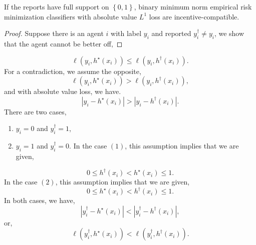 \documentclass{article}
\begin{document}
\begin{lem} \label{lem:dfpd} 
If the reports have full support on $\left\{0, 1\right\}$, binary minimum norm empirical risk minimization classifiers with absolute value $L^{1}$ loss are incentive-compatible.
\end{lem}
\begin{proof} \label{proof:dfpdpf} 
Suppose there is an agent $i $ with label $y_{i}$ and reported $y^{\dagger}_{i} \neq  y_{i}$, we show that the agent cannot be better off,
\end{proof}
\begin{equation} 
\ell\left(y_{i}, h^\star \left(x_{i}\right)\right) \leq  \ell\left(y_{i}, h^{\dagger}\left(x_{i}\right)\right).
\end{equation}
For a contradiction, we assume the opposite,
\begin{equation} \label{equation:asm} 
\ell\left(y_{i}, h^\star \left(x_{i}\right)\right) > \ell\left(y_{i}, h^{\dagger}\left(x_{i}\right)\right),
\end{equation}
and with absolute value loss, we have.
\begin{equation} 
\left| y_{i} - h^\star \left(x_{i}\right) \right| > \left| y_{i} - h^{\dagger}\left(x_{i}\right) \right|.
\end{equation}
There are two cases,
\begin{enumerate}
\item $y_{i} = 0$ and $y^{\dagger}_{i} = 1$,
\item $y_{i} = 1$ and $y^{\dagger}_{i} = 0$.
In the case $\left(1\right)$, this assumption implies that we are given,
\end{enumerate}
\begin{equation} 
0 \leq  h^{\dagger}\left(x_{i}\right) < h^\star \left(x_{i}\right) \leq  1.
\end{equation}
In the case $\left(2\right)$, this assumption implies that we are given,
\begin{equation} 
0 \leq  h^\star \left(x_{i}\right) < h^{\dagger}\left(x_{i}\right) \leq  1.
\end{equation}
In both cases, we have,
\begin{equation} 
\left| y^{\dagger}_{i} - h^\star \left(x_{i}\right) \right| < \left| y^{\dagger}_{i} - h^{\dagger}\left(x_{i}\right) \right|,
\end{equation}
or,
\begin{equation} \label{equation:cls} 
\ell\left(y^{\dagger}_{i}, h^\star \left(x_{i}\right)\right) < \ell\left(y^{\dagger}_{i}, h^{\dagger}\left(x_{i}\right)\right).
\end{equation}
\end{document}
